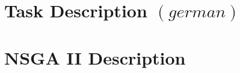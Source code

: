 \documentclass[./\jobname.tex]{subfiles}
\begin{document}
\chapter{Task Description $\left( german \right) $}


\chapter{NSGA II Description}
\label{chap: NSGA2_Description}

\end{document}
